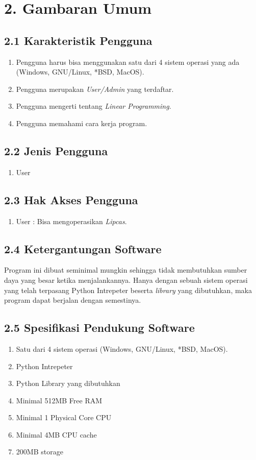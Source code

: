 \documentclass[a4paper]{article}
\begin{document}
\section*{2. Gambaran Umum}
    \subsection*{2.1 Karakteristik Pengguna}
    \begin{enumerate}
        \item Pengguna harus bisa menggunakan satu dari 4 sistem operasi yang ada (Windows, GNU/Linux, *BSD, MacOS).
        \item Pengguna merupakan \textit{User/Admin} yang terdaftar.
        \item Pengguna mengerti tentang \textit{Linear Programming}.
        \item Pengguna memahami cara kerja program.
    \end{enumerate}
    \subsection*{2.2 Jenis Pengguna}
    \begin{enumerate}
        \item User 
    \end{enumerate}
    \subsection*{2.3 Hak Akses Pengguna}
    \begin{enumerate}
        \item User : Bisa mengoperasikan \textit{Lipcas}.
    \end{enumerate}
    \subsection*{2.4 Ketergantungan Software}
    \noindent Program ini dibuat seminimal mungkin sehingga tidak membutuhkan
    sumber daya yang besar ketika menjalankannya. Hanya dengan sebuah sistem operasi
    yang telah terpasang Python Intrepeter beserta \textit{library} yang 
    dibutuhkan, maka program dapat berjalan dengan semestinya.
    \subsection*{2.5 Spesifikasi Pendukung Software}
    \begin{enumerate}
        \item Satu dari 4 sistem operasi (Windows, GNU/Linux, *BSD, MacOS).
        \item Python Intrepeter
        \item Python Library yang dibutuhkan
        \item Minimal 512MB Free RAM 
        \item Minimal 1 Physical Core CPU
        \item Minimal 4MB CPU cache
        \item 200MB storage
    \end{enumerate}
\end{document}
